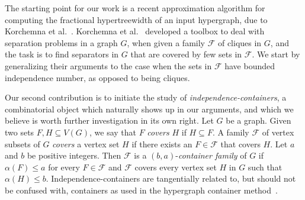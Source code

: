 \documentclass[11pt]{amsart}
\newcommand{\cal}{\mathcal}
\begin{document}
The starting point for our work is a recent approximation algorithm for computing the fractional hypertreewidth of an input hypergraph, due to Korchemna et al.~\cite{KorchemnaL0S024}. Korchemna et al.~\cite{KorchemnaL0S024} developed a toolbox to deal with separation problems in a graph $G$, when given a family ${\cal F}$ of cliques in $G$, and the task is to find separators in $G$ that are covered by few sets in ${\cal F}$.
%
We start by generalizing their arguments to the case when the sets in ${\cal F}$ have bounded independence number, as opposed to being cliques. %

Our second contribution is to initiate the study of {\em independence-containers}, a combinatorial object which naturally shows up in our arguments, and which we believe is worth further investigation in its own right. Let $G$ be a graph. Given two sets $F,H\subseteq V(G)$, we say that $F$ {\em covers} $H$ if $H \subseteq F$. A family $\mathcal{F}$ of vertex subsets of $G$ \emph{covers} a vertex set $H$ if there exists an $F\in\mathcal{F}$ that covers $H$. Let $a$ and $b$ be positive integers. Then 
%
$\mathcal{F}$ is a $(b,a)$-{\em container family} of $G$ if 
$\alpha(F)\leq a$ for every $F\in\mathcal{F}$ and 
$\mathcal{F}$ covers every vertex set $H$ in $G$ such that $\alpha(H) \leq b$.
%
Independence-containers are tangentially related to, but should not be confused with, containers as used in the hypergraph container method~\cite{saxton2015hypergraph,balogh2018method}.
\end{document}
